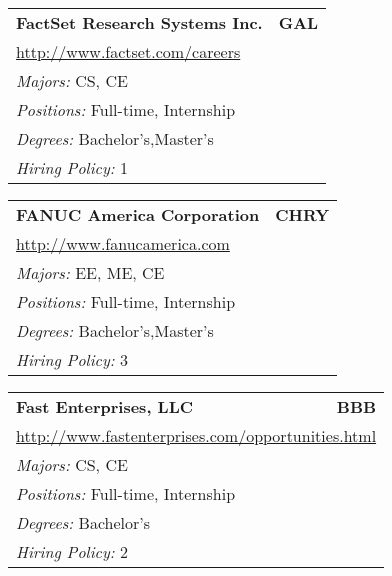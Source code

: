\documentclass[twoside]{article}
\begin{document}
\begin{center}
\begin{multicols}{3}
\begin{FlushLeft}
\begin{minipage}{\columnwidth}
\end{minipage}
 
\begin{minipage}{\columnwidth}\begin{tabularx}{.95\columnwidth}{Xr}
                 {\Large\bf FactSet Research Systems Inc.} & {\Large\bf GAL}\\
    \multicolumn{2}{p{.95\columnwidth}}{\url{http://www.factset.com/careers}}\\
    \multicolumn{2}{p{.95\columnwidth}}{\emph{Majors:} CS, CE}\\
    \multicolumn{2}{p{.95\columnwidth}}{\emph{Positions:} Full-time, Internship}\\
    \multicolumn{2}{p{.95\columnwidth}}{\emph{Degrees:} Bachelor's,Master's}\\
    \multicolumn{2}{p{.95\columnwidth}}{\emph{Hiring Policy:} 1}\\
    \end{tabularx}
    
\end{minipage}
 
\begin{minipage}{\columnwidth}\begin{tabularx}{.95\columnwidth}{Xr}
                 {\Large\bf FANUC America Corporation} & {\Large\bf CHRY}\\
    \multicolumn{2}{p{.95\columnwidth}}{\url{http://www.fanucamerica.com}}\\
    \multicolumn{2}{p{.95\columnwidth}}{\emph{Majors:} EE, ME, CE}\\
    \multicolumn{2}{p{.95\columnwidth}}{\emph{Positions:} Full-time, Internship}\\
    \multicolumn{2}{p{.95\columnwidth}}{\emph{Degrees:} Bachelor's,Master's}\\
    \multicolumn{2}{p{.95\columnwidth}}{\emph{Hiring Policy:} 3}\\
    \end{tabularx}
    
\end{minipage}
 
\begin{minipage}{\columnwidth}\begin{tabularx}{.95\columnwidth}{Xr}
                 {\Large\bf Fast Enterprises, LLC} & {\Large\bf BBB}\\
    \multicolumn{2}{p{.95\columnwidth}}{\url{http://www.fastenterprises.com/opportunities.html}}\\
    \multicolumn{2}{p{.95\columnwidth}}{\emph{Majors:} CS, CE}\\
    \multicolumn{2}{p{.95\columnwidth}}{\emph{Positions:} Full-time, Internship}\\
    \multicolumn{2}{p{.95\columnwidth}}{\emph{Degrees:} Bachelor's}\\
    \multicolumn{2}{p{.95\columnwidth}}{\emph{Hiring Policy:} 2}\\
    \end{tabularx}
    

\end{minipage}
\end{FlushLeft}
\end{multicols}
\end{center}
\end{document}
